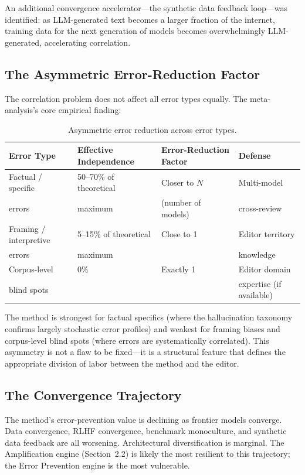 \documentclass[11pt,letterpaper]{article}
\begin{document}
An additional convergence accelerator---the synthetic data feedback loop---was identified: as LLM-generated text becomes a larger fraction of the internet, training data for the next generation of models becomes overwhelmingly LLM-generated, accelerating correlation.

\subsection{The Asymmetric Error-Reduction Factor}

The correlation problem does not affect all error types equally. The meta-analysis's core empirical finding:

\begin{table}[ht]
\centering
\caption{Asymmetric error reduction across error types.}
\label{tab:error-reduction}
\begin{tabular}{@{}llll@{}}
\toprule
\textbf{Error Type} & \textbf{Effective Independence} & \textbf{Error-Reduction Factor} & \textbf{Defense} \\
\midrule
Factual / specific & 50--70\% of theoretical & Closer to $N$ & Multi-model \\
errors & maximum & (number of models) & cross-review \\
\addlinespace
Framing / interpretive & 5--15\% of theoretical & Close to 1 & Editor territory \\
errors & maximum & & knowledge \\
\addlinespace
Corpus-level & 0\% & Exactly 1 & Editor domain \\
blind spots & & & expertise (if available) \\
\bottomrule
\end{tabular}
\end{table}

The method is strongest for factual specifics (where the hallucination taxonomy confirms largely stochastic error profiles) and weakest for framing biases and corpus-level blind spots (where errors are systematically correlated). This asymmetry is not a flaw to be fixed---it is a structural feature that defines the appropriate division of labor between the method and the editor.

\subsection{The Convergence Trajectory}

The method's error-prevention value is declining as frontier models converge. Data convergence, RLHF convergence, benchmark monoculture, and synthetic data feedback are all worsening. Architectural diversification is marginal. The Amplification engine (Section~2.2) is likely the most resilient to this trajectory; the Error Prevention engine is the most vulnerable.
\end{document}
